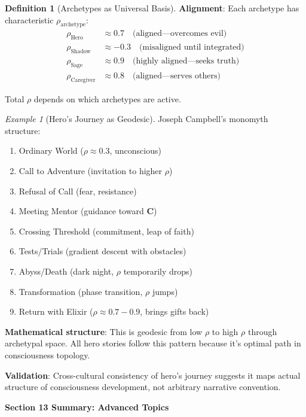 \documentclass[11pt,a4paper]{article}
\theoremstyle{definition}
\newtheorem{definition}{Definition}[section]
\theoremstyle{remark}
\newtheorem{example}{Example}[section]
\begin{document}
\begin{enumerate}
\begin{definition}[Archetypes as Universal Basis]
\textbf{Alignment}: Each archetype has characteristic \(\rho_{\text{archetype}}\):
\begin{align}
\rho_{\text{Hero}} &\approx 0.7 \quad \text{(aligned—overcomes evil)} \\
\rho_{\text{Shadow}} &\approx -0.3 \quad \text{(misaligned until integrated)} \\
\rho_{\text{Sage}} &\approx 0.9 \quad \text{(highly aligned—seeks truth)} \\
\rho_{\text{Caregiver}} &\approx 0.8 \quad \text{(aligned—serves others)}
\end{align}

Total \(\rho\) depends on which archetypes are active.
\end{definition}

\begin{example}[Hero's Journey as Geodesic]
Joseph Campbell's monomyth structure:
\begin{enumerate}
    \item Ordinary World (\(\rho \approx 0.3\), unconscious)
    \item Call to Adventure (invitation to higher \(\rho\))
    \item Refusal of Call (fear, resistance)
    \item Meeting Mentor (guidance toward \(\mathbf{C}\))
    \item Crossing Threshold (commitment, leap of faith)
    \item Tests/Trials (gradient descent with obstacles)
    \item Abyss/Death (dark night, \(\rho\) temporarily drops)
    \item Transformation (phase transition, \(\rho\) jumps)
    \item Return with Elixir (\(\rho \approx 0.7-0.9\), brings gifts back)
\end{enumerate}

\textbf{Mathematical structure}: This is geodesic from low \(\rho\) to high \(\rho\) through archetypal space. All hero stories follow this pattern because it's optimal path in consciousness topology.

\textbf{Validation}: Cross-cultural consistency of hero's journey suggests it maps actual structure of consciousness development, not arbitrary narrative convention.
\end{example}

\begin{mdframed}[backgroundcolor=green!10,linewidth=2pt,linecolor=green!70!black]
\textbf{Section 13 Summary: Advanced Topics}


\end{mdframed}
\end{enumerate}
\end{document}
